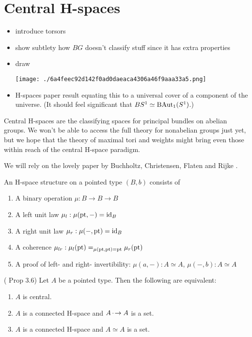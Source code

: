 \section{Central H-spaces}\label{central-h-spaces}

\begin{itemize}
\item
  introduce torsors
\item
  show subtlety how \(BG\) doesn't classify stuff since it has extra
  properties
\item
  draw

  \texttt{[image: ./6a4feec92d142f0ad0daeaca4306a46f9aaa33a5.png]}
\item
  H-spaces paper result equating this to a universal cover of a
  component of the universe. (It should feel significant that
  \(BS^1\simeq \mathrm{BAut}_1(S^1)\).)
\end{itemize}

Central H-spaces are the classifying spaces for principal bundles on
abelian groups. We won't be able to access the full theory for
nonabelian groups just yet, but we hope that the theory of maximal tori
and weights might bring even those within reach of the central H-space
paradigm.

We will rely on the lovely paper by Buchholtz, Christensen, Flaten and
Rijke \cite{buchholtz2023central}.

\begin{mydef}
An H-space structure on a pointed type \( (B,b) \) consists of
\begin{enumerate}
\item A binary operation \( \mu:B\to B\to B \)
\item A left unit law \( \mu_l:\mu(\mathrm{pt},-)=\text{id}_B \)
\item A right unit law \( \mu_r:\mu(-,\mathrm{pt})=\text{id}_B \)
\item A coherence \( \mu_{lr}:\mu_l(\mathrm{pt})=_{\mu(\mathrm{pt},\mathrm{pt})=\mathrm{pt}}\mu_r(\mathrm{pt}) \)
\item A proof of left- and right- invertibility: \( \mu(a,-):A\simeq A \), \( \mu(-, b):A\simeq A \)
\end{enumerate}
\end{mydef}

\begin{myprop}
(\cite{buchholtz2023central} Prop 3.6) Let \( A \) be a pointed type. Then the following are equivalent:
\begin{enumerate}
\item \( A \) is central.
\item \( A \) is a connected H-space and \( A\,\cdot\!\to A \) is a set.
\item \( A \) is a connected H-space and \( A\simeq A \) is a set.
\end{enumerate}
\end{myprop}

